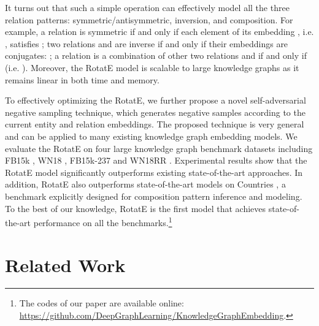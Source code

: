 \documentclass{article} \usepackage{iclr2019_conference,times}
\def\method{RotatE}
\begin{document}
It turns out that such a simple operation can effectively model all the three relation patterns: symmetric/antisymmetric, inversion, and composition. For example, a relation  is symmetric if and only if each element of its embedding , i.e. , satisfies ; two relations  and  are inverse if and only if their embeddings are conjugates: ; a relation  is a combination of other two relations  and  if and only if  (i.e. ). Moreover, the \method{} model is scalable to large knowledge graphs as it remains linear in both time and memory. 

To effectively optimizing the \method{}, we further propose a novel self-adversarial negative sampling technique, which generates negative samples according to the current entity and relation embeddings. The proposed technique is very general and can be applied to many existing knowledge graph embedding models. We evaluate the \method{} on four large knowledge graph benchmark datasets including FB15k \citep{bordes2013translating}, WN18 \citep{bordes2013translating}, FB15k-237 \citep{toutanova2015observed} and WN18RR \citep{dettmers2017convolutional}. Experimental results show that the \method{} model significantly outperforms existing state-of-the-art approaches. In addition, \method{} also outperforms state-of-the-art models on Countries \citep{bouchard2015approximate}, a benchmark explicitly designed for composition pattern inference and modeling. To the best of our knowledge, \method{} is the first model that achieves state-of-the-art performance on all the benchmarks.\footnote{The codes of our paper are available online: \url{https://github.com/DeepGraphLearning/KnowledgeGraphEmbedding}.}



\section{Related Work}
\end{document}
